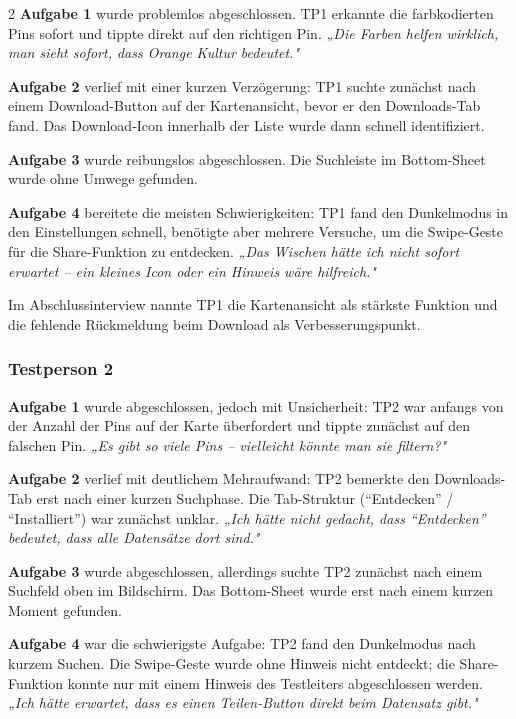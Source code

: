 \begin{multicols}{2}
\textbf{Aufgabe 1} wurde problemlos abgeschlossen.
TP1 erkannte die farbkodierten Pins sofort und tippte direkt auf den
richtigen Pin.
\textit{„Die Farben helfen wirklich, man sieht sofort, dass Orange
Kultur bedeutet."}

\textbf{Aufgabe 2} verlief mit einer kurzen Verzögerung:
TP1 suchte zunächst nach einem Download-Button auf der Kartenansicht,
bevor er den Downloads-Tab fand.
Das Download-Icon innerhalb der Liste wurde dann schnell identifiziert.

\textbf{Aufgabe 3} wurde reibungslos abgeschlossen.
Die Suchleiste im Bottom-Sheet wurde ohne Umwege gefunden.

\textbf{Aufgabe 4} bereitete die meisten Schwierigkeiten:
TP1 fand den Dunkelmodus in den Einstellungen schnell,
benötigte aber mehrere Versuche, um die Swipe-Geste für die
Share-Funktion zu entdecken.
\textit{„Das Wischen hätte ich nicht sofort erwartet –
ein kleines Icon oder ein Hinweis wäre hilfreich."}

Im Abschlussinterview nannte TP1 die Kartenansicht als stärkste Funktion
und die fehlende Rückmeldung beim Download als Verbesserungspunkt.

\subsubsection*{Testperson 2}

\textbf{Aufgabe 1} wurde abgeschlossen, jedoch mit Unsicherheit:
TP2 war anfangs von der Anzahl der Pins auf der Karte überfordert
und tippte zunächst auf den falschen Pin.
\textit{„Es gibt so viele Pins – vielleicht könnte man sie filtern?"}

\textbf{Aufgabe 2} verlief mit deutlichem Mehraufwand:
TP2 bemerkte den Downloads-Tab erst nach einer kurzen Suchphase.
Die Tab-Struktur (\enquote{Entdecken} / \enquote{Installiert})
war zunächst unklar.
\textit{„Ich hätte nicht gedacht, dass \enquote{Entdecken} bedeutet,
dass alle Datensätze dort sind."}

\textbf{Aufgabe 3} wurde abgeschlossen, allerdings suchte TP2 zunächst
nach einem Suchfeld oben im Bildschirm.
Das Bottom-Sheet wurde erst nach einem kurzen Moment gefunden.

\textbf{Aufgabe 4} war die schwierigste Aufgabe:
TP2 fand den Dunkelmodus nach kurzem Suchen.
Die Swipe-Geste wurde ohne Hinweis nicht entdeckt;
die Share-Funktion konnte nur mit einem Hinweis des Testleiters
abgeschlossen werden.
\textit{„Ich hätte erwartet, dass es einen Teilen-Button direkt
beim Datensatz gibt."}


\end{multicols}
